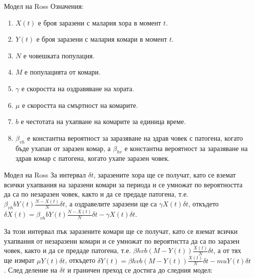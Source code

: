 \begin{frame}[t]{Модел на Ross}
  Означения:
  \begin{enumerate}
    \item $X(t)$ е броя заразени с малария хора в момент $t$.
    \item $Y(t)$ е броя заразени с малария комари в момент $t$.
    \item $N$ е човешката популация.
    \item $M$ е популацията от комари.
    \item $\gamma$ е скоростта на оздравяване на хората.
    \item $\mu$ е скоростта на смъртност на комарите.
    \item $b$ е честотата на ухапване на комарите за единица време.
    \item $\beta_{vh}$ е константна вероятност за заразяване на здрав човек с патогена, когато бъде ухапан от заразен комар, а $\beta_{hv}$ е константна вероятност за заразяване на здрав комар с патогена, когато ухапе заразен човек.
  \end{enumerate}
\end{frame}

\begin{frame}[t]{Модел на Ross}
  За интервал $\delta t$, заразените хора ще се получат, като се вземат всички ухапвания на заразени комари за периода и се умножат по вероятността да са по незаразен човек, както и да се предаде патогена, т.е. $\beta_{vh} b Y(t) \frac{N-X(t)}{N} \delta t$, а оздравелите заразени ще са $\gamma X(t) \delta t$, откъдето $\delta X(t) = \beta_{vh} b Y(t) \frac{N-X(t)}{N} \delta t - \gamma X(t) \delta t$.

  За този интервал пък заразените комари ще се получат, като се вземат всички ухапвания от незаразени комари и се умножат по вероятнстта да са по заразен човек, както и да се предаде патогена, т.е. $\beta{hv} b (M - Y(t)) \frac{X(t)}{N} \delta t$, а от тях ще измрат $\mu Y(t) \delta t$, откъдето $\delta Y(t) = \beta{hv} b (M - Y(t)) \frac{X(t)}{N} \delta t - mu Y(t) \delta t$. След деление на $\delta t$ и граничен преход се достига до следния модел:
\end{frame}

